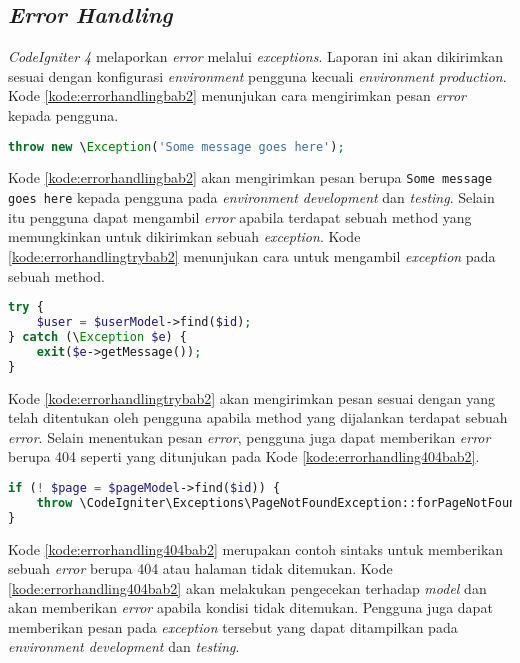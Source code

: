 \subsection{\textit{Error Handling}}
\textit{CodeIgniter 4} melaporkan \textit{error} melalui \textit{exceptions}. Laporan ini akan dikirimkan sesuai dengan konfigurasi \textit{environment} pengguna kecuali \textit{environment production}. Kode \ref{kode:errorhandlingbab2} menunjukan cara mengirimkan pesan \textit{error} kepada pengguna.
\begin{lstlisting}[language=PHP, caption=Contoh penggunaan \texttt{error handling}. ,label=kode:errorhandlingbab2]
throw new \Exception('Some message goes here');
\end{lstlisting}
Kode \ref{kode:errorhandlingbab2} akan mengirimkan pesan berupa \texttt{Some message goes here} kepada pengguna pada \textit{environment development} dan \textit{testing}. Selain itu pengguna dapat mengambil \textit{error} apabila terdapat sebuah method yang memungkinkan untuk dikirimkan sebuah \textit{exception}. Kode \ref{kode:errorhandlingtrybab2} menunjukan cara untuk mengambil \textit{exception} pada sebuah method.
\begin{lstlisting}[language=PHP, caption=Contoh penggunaan \texttt{error handling} untuk mengambil \textit{exception}. ,label=kode:errorhandlingtrybab2]
try {
    $user = $userModel->find($id);
} catch (\Exception $e) {
    exit($e->getMessage());
}
\end{lstlisting}
Kode \ref{kode:errorhandlingtrybab2} akan mengirimkan pesan sesuai dengan yang telah ditentukan oleh pengguna apabila method yang dijalankan terdapat sebuah \textit{error}. Selain menentukan pesan \textit{error}, pengguna juga dapat memberikan \textit{error} berupa 404 seperti yang ditunjukan pada Kode \ref{kode:errorhandling404bab2}.
\begin{lstlisting}[language=PHP, caption=Contoh penggunaan \texttt{error handling} untuk memberikan \textit{error} berupa 404. ,label=kode:errorhandling404bab2]
if (! $page = $pageModel->find($id)) {
    throw \CodeIgniter\Exceptions\PageNotFoundException::forPageNotFound();
}
\end{lstlisting}
Kode \ref{kode:errorhandling404bab2} merupakan contoh sintaks untuk memberikan sebuah \textit{error} berupa 404 atau halaman tidak ditemukan. Kode \ref{kode:errorhandling404bab2} akan melakukan pengecekan terhadap \textit{model} dan akan memberikan \textit{error} apabila kondisi tidak ditemukan. Pengguna juga dapat memberikan pesan pada \textit{exception} tersebut yang dapat ditampilkan pada \textit{environment development} dan \textit{testing}.

